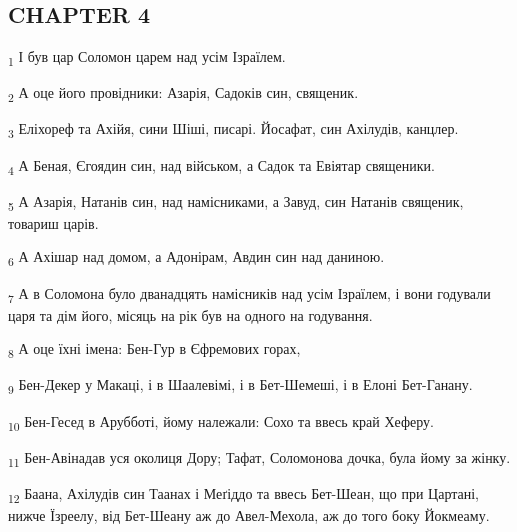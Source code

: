 \subsection{CHAPTER 4}
\begin{tcolorbox}
\textsubscript{1} І був цар Соломон царем над усім Ізраїлем.
\end{tcolorbox}
\begin{tcolorbox}
\textsubscript{2} А оце його провідники: Азарія, Садоків син, священик.
\end{tcolorbox}
\begin{tcolorbox}
\textsubscript{3} Еліхореф та Ахійя, сини Шіші, писарі. Йосафат, син Ахілудів, канцлер.
\end{tcolorbox}
\begin{tcolorbox}
\textsubscript{4} А Беная, Єгоядин син, над військом, а Садок та Евіятар священики.
\end{tcolorbox}
\begin{tcolorbox}
\textsubscript{5} А Азарія, Натанів син, над намісниками, а Завуд, син Натанів священик, товариш царів.
\end{tcolorbox}
\begin{tcolorbox}
\textsubscript{6} А Ахішар над домом, а Адонірам, Авдин син над даниною.
\end{tcolorbox}
\begin{tcolorbox}
\textsubscript{7} А в Соломона було дванадцять намісників над усім Ізраїлем, і вони годували царя та дім його, місяць на рік був на одного на годування.
\end{tcolorbox}
\begin{tcolorbox}
\textsubscript{8} А оце їхні імена: Бен-Гур в Єфремових горах,
\end{tcolorbox}
\begin{tcolorbox}
\textsubscript{9} Бен-Декер у Макаці, і в Шаалевімі, і в Бет-Шемеші, і в Елоні Бет-Ганану.
\end{tcolorbox}
\begin{tcolorbox}
\textsubscript{10} Бен-Гесед в Арубботі, йому належали: Сохо та ввесь край Хеферу.
\end{tcolorbox}
\begin{tcolorbox}
\textsubscript{11} Бен-Авінадав уся околиця Дору; Тафат, Соломонова дочка, була йому за жінку.
\end{tcolorbox}
\begin{tcolorbox}
\textsubscript{12} Баана, Ахілудів син Таанах і Меґіддо та ввесь Бет-Шеан, що при Цартані, нижче Їзреелу, від Бет-Шеану аж до Авел-Мехола, аж до того боку Йокмеаму.
\end{tcolorbox}
